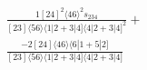\documentclass[varwidth, border=5pt]{standalone}
\begin{document}
\begin{my}
$\begin{gathered}
\scriptscriptstyle\frac{1[24]^2⟨46⟩^2s_{234}}{[23]⟨56⟩⟨1|2+3|4]⟨4|2+3|4]^2}+\\
\scriptscriptstyle\frac{-2[24]⟨46⟩⟨6|1+5|2]}{[23]⟨56⟩⟨1|2+3|4]⟨4|2+3|4]}\phantom{+}
\end{gathered}$
\end{my}
\end{document}
